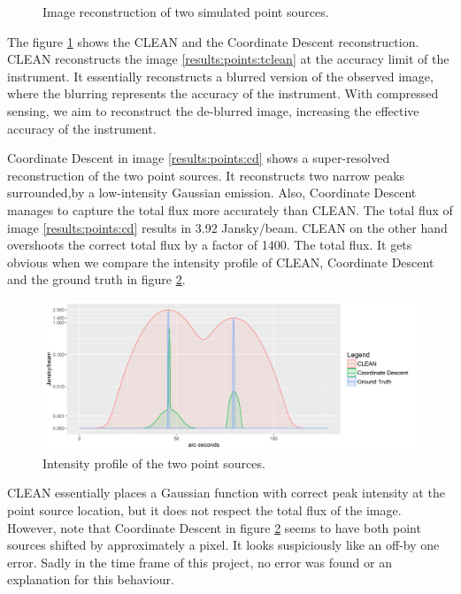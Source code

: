 \begin{figure}[h]
	\caption{Image reconstruction of two simulated point sources.}
	\label{results:points}
\end{figure}

The figure \ref{results:points} shows the CLEAN and the Coordinate Descent reconstruction. CLEAN reconstructs the image \ref{results:points:tclean} at the accuracy limit of the instrument. It essentially reconstructs a blurred version of the observed image, where the blurring represents the accuracy of the instrument. With compressed sensing, we aim to reconstruct the de-blurred image, increasing the effective accuracy of the instrument. 

Coordinate Descent in image \ref{results:points:cd} shows a super-resolved reconstruction of the two point sources. It reconstructs two narrow peaks surrounded,by a low-intensity Gaussian emission. Also, Coordinate Descent manages to capture the total flux more accurately than CLEAN.  The total flux of image \ref{results:points:cd} results in 3.92 Jansky/beam. CLEAN on the other hand overshoots the correct total flux by a factor of 1400. The total flux. It gets obvious when we compare the intensity profile of CLEAN, Coordinate Descent and the ground truth in figure \ref{results:points:contour}.

\begin{figure}[h]
	\centering
	\includegraphics[width=0.8\linewidth]{./chapters/20.results/points/contour_points.png}
	\caption{Intensity profile of the two point sources.}
	\label{results:points:contour}
\end{figure}

CLEAN essentially places a Gaussian function with correct peak intensity at the point source location, but it does not respect the total flux of the image. However, note that Coordinate Descent in figure \ref{results:points:contour} seems to have both point sources shifted by approximately a pixel. It looks suspiciously like an off-by one error. Sadly in the time frame of this project, no error was found or an explanation for this behaviour.


